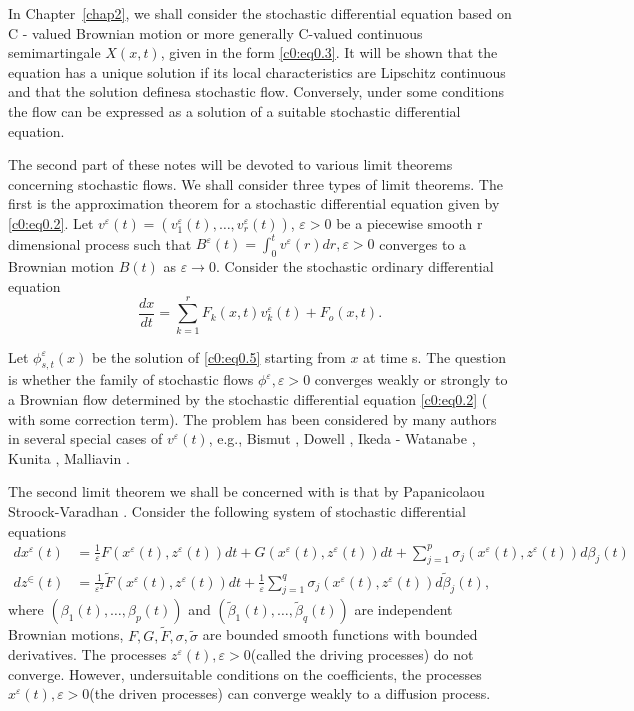  In Chapter~\ref{chap2}, we shall consider the stochastic differential equation
 based on C - valued Brownian motion or more generally C-valued
 continuous semimartingale $X(x,t)$, given in the form \eqref{c0:eq0.3}. It will
 be shown that the equation has a unique solution if its local
 characteristics are Lipschitz continuous and that the solution
 defines\pageoriginale a stochastic flow. Conversely, under some conditions the flow
 can be expressed as a solution of a suitable stochastic differential
 equation. 
 
 The second part of these notes will be devoted to various limit
 theorems concerning stochastic flows. We  shall consider three types
 of limit theorems. The first is the approximation theorem for a
 stochastic differential equation given by \eqref{c0:eq0.2}. Let 
 $v^\varepsilon (t) = (v^\varepsilon_1 (t), \dots,  v^\varepsilon_r(t))$, 
 $\varepsilon > 0$ be a piecewise smooth r dimensional process such that
 $B^\varepsilon (t) = \int^t_0 v^\varepsilon (r) dr, \varepsilon > 0$
 converges to a Brownian motion $B(t)$ as $\varepsilon \rightarrow
 0$. Consider the stochastic ordinary differential equation 
 \begin{equation*}
   \frac{dx}{dt} = \sum\limits^r_{k=1} F_k(x,t) v^\varepsilon_k (t) +
   F_o(x,t). \tag{0.5}\label{c0:eq0.5} 
 \end{equation*}
  
 Let $\phi^\varepsilon_{s,t}(x)$ be the solution of \eqref{c0:eq0.5} starting
 from $x$ at time s. The question is whether the family of stochastic
 flows $\phi^\varepsilon,  \varepsilon > 0$ converges weakly or
 strongly to a Brownian flow determined by the stochastic differential
 equation \eqref{c0:eq0.2} ( with some correction term). The problem has been
 considered by many authors in several special cases of $v^\varepsilon
 (t)$, e.g., Bismut \cite{3},  Dowell \cite{6}, Ikeda - Watanabe \cite{14}, Kunita
 \cite{15}, Malliavin \cite{25}. 
 
 The second limit theorem we shall be concerned with is that by
 Papanicolaou Stroock-Varadhan \cite{29}. Consider the following system
 of stochastic differential equations 
  \begin{align*}
    dx^\varepsilon(t) & = \frac{1}{\varepsilon} F(x^\varepsilon(t),
    z^\varepsilon (t))dt + G(x^\varepsilon (t), z^\varepsilon(t))dt +
    \sum^p_{j = 1} \sigma_j (x^\varepsilon (t), z^\varepsilon(t))d
    \beta_j (t) \\ 
    dz^\in(t) & =\frac{1}{\varepsilon^2} \tilde{F} (x^\varepsilon(t),
    z^\varepsilon (t))dt + \frac{1}{\varepsilon} \sum^q_{j = 1}
    \sigma_j (x^\varepsilon (t), z^\varepsilon(t))d \tilde{\beta}_j
    (t),  
 \end{align*} 
 where $( \beta_1(t), \ldots,  \beta_{p}(t))$ and $(
 \tilde{\beta}_1(t), \ldots,  \tilde{\beta}_{q}(t))$ are independent
 Brownian motions, $F, G, \tilde{F}, \sigma,  \tilde{\sigma}$ are
 bounded smooth functions with bounded derivatives. The processes
 $z^\varepsilon (t), \varepsilon > 0$(called the driving processes) do
 not converge. However, under\pageoriginale suitable conditions on the
 coefficients, the processes $x^\varepsilon (t), \varepsilon > 0$(the
 driven processes) can converge weakly to a diffusion process. 
 

